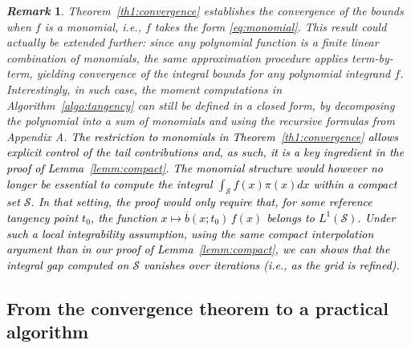 \documentclass[review]{elsarticle}
\newcommand{\cblue}{\textcolor{black}}
\newtheorem{remark}{\em Remark}
\begin{document}
\begin{remark}
\label{remarkmonomial}
Theorem~\ref{th1:convergence} establishes the convergence of the bounds when $f$ is a monomial, i.e., $f$ takes the form \eqref{eq:monomial}. This result could actually be extended further: since any polynomial function is a finite linear combination of monomials, the same approximation procedure applies term-by-term, yielding convergence of the integral bounds for any polynomial integrand $f$. Interestingly, in such case, the moment computations in Algorithm~\ref{algo:tangency} can still be defined in a closed form, by decomposing the polynomial into a sum of monomials and using the recursive formulas from Appendix A. 
\cblue{
The restriction to monomials in Theorem~\ref{th1:convergence} allows explicit control of the tail contributions and, as such, it is a key ingredient in the proof of Lemma~\ref{lemm:compact}. The monomial structure would however no longer be essential to compute the integral $\int_{\mathcal{S}} f(x) \pi(x) dx$ within a compact set $\mathcal{S}$. In that setting, the proof would only require that, for some reference tangency point $t_0$, the function $x\mapsto \overline b(x;t_0)\,f(x)$ belongs to $L^1(\mathcal{S})$. Under such a local integrability assumption, using the same compact interpolation argument than in our proof of Lemma~\ref{lemm:compact}, we can shows that the integral gap computed on $\mathcal{S}$ vanishes over iterations (i.e., as the grid is refined).
}
\end{remark}






\subsection{From the convergence theorem to a practical algorithm} \label{sec:algopractical}
\end{document}
